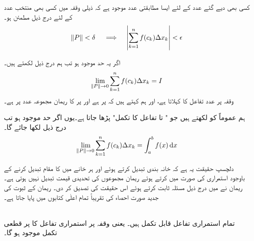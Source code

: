 کسی بھی دیے گئے عدد  کے لئے ایسا مطابقتی عدد  موجود ہے کہ ذیلی وقفہ  میں کسی بھی منتخب عدد  کے لئے  درج ذیل مطمئن ہو۔
\begin{align*}
\norm{P}<\delta\quad\implies\quad \abs{\sum\limits_{k=1}^n f(c_k)\Delta x_k}<\epsilon
\end{align*}

اگر یہ حد موجود ہو تب ہم  درج ذیل لکھتے ہیں۔
\begin{align*}
\lim_{\norm{P}\to 0}\sum\limits_{k=1}^n f(c_k)\Delta x_k=I
\end{align*}
وقفہ  پر  عدد  تفاعل   کا  کہلاتا ہے، اور ہم کہتے ہیں کہ  پر   ہے اور  پر  کا ریمان مجموعہ عدد  پر  ہے۔

ہم عموماً  کو  لکھتے ہیں جو " تا  تفاعل  کا تکمل" پڑھا جاتا ہے۔یوں اگر حد موجود ہو تب درج ذیل لکھا جائے گا۔
\begin{align*}
\lim_{\norm{P}\to 0}\sum\limits_{k=1}^nf(c_k)\Delta x_k=\int_a^bf(x)\dif x
\end{align*}

دلچسپ حقیقت یہ ہے کہ خانہ بندی تبدیل کرتے ہوئے اور ہر خانے میں  کا مقام تبدیل کرنے کے باوجود استمراری  کی صورت میں   کرتے ہوئے ریمان مجموعوں  کی تحدیدی قیمت تبدیل نہیں ہوتی ہے۔ریمان نے  میں درج ذیل مسئلہ ثابت کرتے ہوئے اس حقیقت کی تصدیق کر دی۔ ریمان کے ثبوت کی جدید صورت احصاء کی تقریباً تمام اعلٰی  کتابوں میں پایا جاتا ہے۔

\\
تمام استمراری تفاعل قابل تکمل ہیں۔ یعنی وقفہ  پر استمراری تفاعل  کا  پر قطعی تکمل موجود ہو گا۔

